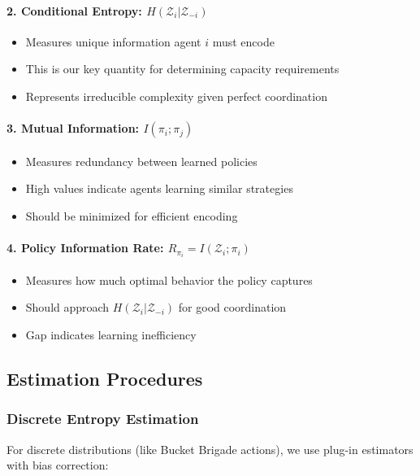 \documentclass[10pt, letterpaper]{article}
\begin{document}
\paragraph{2. Conditional Entropy: $H(\mathcal{Z}_i | \mathcal{Z}_{-i})$}
\begin{itemize}
    \item Measures unique information agent $i$ must encode
    \item This is our key quantity for determining capacity requirements
    \item Represents irreducible complexity given perfect coordination
\end{itemize}

\paragraph{3. Mutual Information: $I(\pi_i; \pi_j)$}
\begin{itemize}
    \item Measures redundancy between learned policies
    \item High values indicate agents learning similar strategies
    \item Should be minimized for efficient encoding
\end{itemize}

\paragraph{4. Policy Information Rate: $R_{\pi_i} = I(\mathcal{Z}_i; \pi_i)$}
\begin{itemize}
    \item Measures how much optimal behavior the policy captures
    \item Should approach $H(\mathcal{Z}_i | \mathcal{Z}_{-i})$ for good coordination
    \item Gap indicates learning inefficiency
\end{itemize}

\subsection{Estimation Procedures}

\subsubsection{Discrete Entropy Estimation}

For discrete distributions (like Bucket Brigade actions), we use plug-in estimators with bias correction:
\end{document}
